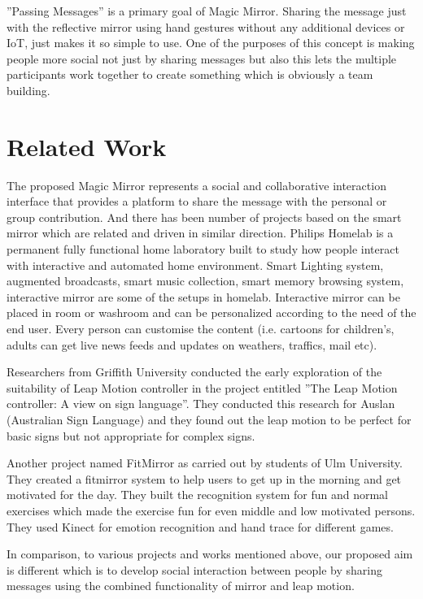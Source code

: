 \documentclass{sigchi-ext}
\begin{document}
''Passing Messages'' is a primary goal of Magic Mirror. Sharing the message just with the reflective mirror using hand gestures without any additional devices or IoT, just makes it so simple to use. One of the purposes of this concept is making people more social not just by sharing messages but also this lets the multiple participants work together to create something which is obviously a team building.

\section{Related Work}
The proposed Magic Mirror represents a social and collaborative interaction interface that provides a platform to share the message with the personal or group contribution. And there has been number of projects based on the smart mirror which are related and driven in similar direction. Philips Homelab is a permanent fully functional home laboratory built to study how people interact with interactive and automated home environment. Smart Lighting system, augmented broadcasts, smart music collection, smart memory browsing system, interactive mirror are some of the setups in homelab. Interactive mirror can be placed in room or washroom and can be personalized according to the need of the end user. Every person can customise the content (i.e. cartoons for children's, adults can get live news feeds and updates on weathers, traffics, mail etc).

Researchers from Griffith University conducted the early exploration of the suitability of Leap Motion controller in the project entitled ''The Leap Motion controller: A view on sign language''. They conducted this research for Auslan (Australian Sign Language) and they found out the leap motion to be perfect for basic signs but not appropriate for complex signs.

Another project named FitMirror as carried out by students of Ulm University. They created a fitmirror system to help users to get up in the morning and get motivated for the day. They built the recognition system for fun and normal exercises which made the exercise fun for even middle and low motivated persons. They used Kinect for emotion recognition and hand trace for different games.

In comparison, to various projects and works mentioned above, our proposed aim is different which is to develop social interaction between people by sharing messages using the combined functionality of mirror and leap motion.
\end{document}
